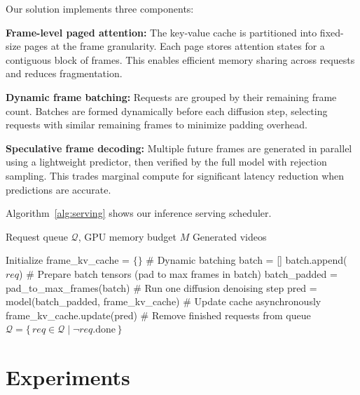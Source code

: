 \documentclass[journal,twoside]{IEEEtran}
\theoremstyle{definition}
\theoremstyle{remark}
\begin{document}
Our solution implements three components:

\textbf{Frame-level paged attention:} The key-value cache is partitioned into fixed-size pages at the frame granularity. Each page stores attention states for a contiguous block of frames. This enables efficient memory sharing across requests and reduces fragmentation.

\textbf{Dynamic frame batching:} Requests are grouped by their remaining frame count. Batches are formed dynamically before each diffusion step, selecting requests with similar remaining frames to minimize padding overhead.

\textbf{Speculative frame decoding:} Multiple future frames are generated in parallel using a lightweight predictor, then verified by the full model with rejection sampling. This trades marginal compute for significant latency reduction when predictions are accurate.

Algorithm~\ref{alg:serving} shows our inference serving scheduler.

\begin{algorithm}[!t]
\footnotesize
\caption{Continuous Batching for Video Diffusion}
\label{alg:serving}
\begin{algorithmic}[1]
\REQUIRE Request queue $\mathcal{Q}$, GPU memory budget $M$
\ENSURE Generated videos

\STATE Initialize frame\_kv\_cache = $\{\}$
    \STATE \# Dynamic batching
    \STATE batch = []
            \STATE batch.append($req$)
        \ENDIF
    \ENDFOR
    \STATE \# Prepare batch tensors (pad to max frames in batch)
    \STATE batch\_padded = pad\_to\_max\_frames(batch)
    \STATE \# Run one diffusion denoising step
    \STATE pred = model(batch\_padded, frame\_kv\_cache)
    \STATE \# Update cache asynchronously
    \STATE frame\_kv\_cache.update(pred)
    \STATE \# Remove finished requests from queue
    \STATE $\mathcal{Q} = \{\, req \in \mathcal{Q} \mid \neg req.\text{done} \,\}$
\ENDWHILE
\end{algorithmic}
\end{algorithm}

\section{Experiments}
\label{sec:experiments}
\end{document}
